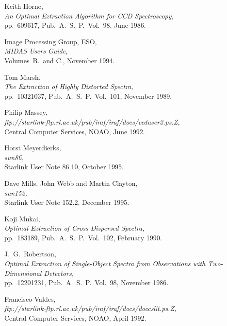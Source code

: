 \begin{thebibliography}{999}
 Keith Horne,\\
      {\sl An Optimal Extraction Algorithm for CCD Spectroscopy,}\\
      pp.~609\sgspec{--}{-}617, Pub.~A.~S.~P.~Vol.~98, June 1986.

 Image Processing Group, ESO,\\
      {\sl MIDAS Users Guide,}\\
      Volumes~B.~and C., November 1994.

 Tom Marsh,\\
      {\sl The Extraction of Highly Distorted Spectra,}\\
      pp.~1032\sgspec{--}{-}1037, Pub.~A.~S.~P.~Vol.~101, November 1989.

 Philip Massey,\\
      {\sl
      {ftp://starlink-ftp.rl.ac.uk/pub/iraf/iraf/docs/ccduser2.ps.Z},}\\
      Central Computer Services, NOAO, June 1992.

 Horst Meyerdierks,\\
      {\sl {}
      {sun86}{},}\\
      Starlink User Note 86.10, October 1995.

 Dave Mills, John Webb and Martin Clayton,\\
      {\sl {}
      {sun152}{},}\\
      Starlink User Note 152.2, December 1995.

 Koji Mukai,\\
    {\sl Optimal Extraction of Cross-Dispersed Spectra,}\\
    pp.~183\sgspec{--}{-}189, Pub.~A.~S.~P.~Vol.~102, February 1990.

 J.~G.~Robertson,\\
     {\sl Optimal Extraction of Single-Object Spectra from Observations
     with Two-Dimensional Detectors,}\\
     pp.~1220\sgspec{--}{-}1231, Pub.~A.~S.~P.~Vol.~98, November 1986.

 Francisco Valdes,\\
      {\sl
      {ftp://starlink-ftp.rl.ac.uk/pub/iraf/iraf/docs/doecslit.ps.Z},}\\
      Central Computer Services, NOAO, April 1992.


\end{thebibliography}
